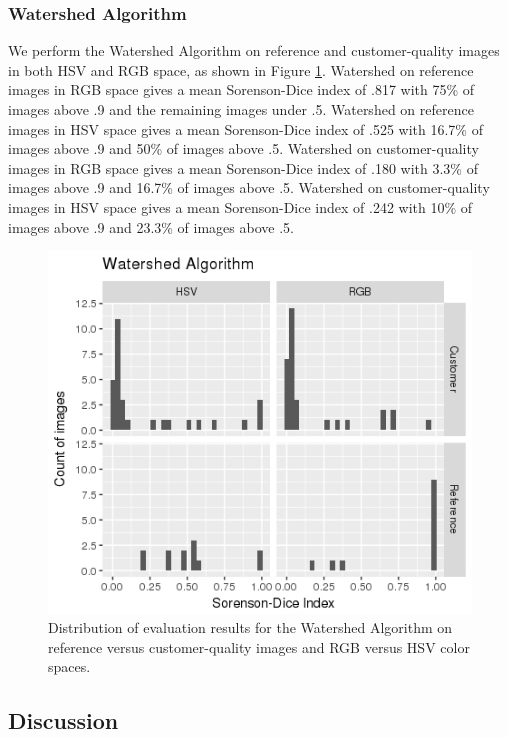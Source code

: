 \documentclass{article}
\begin{document}
\subsubsection{Watershed Algorithm}

We perform the Watershed Algorithm \cite{watershed} on reference and customer-quality images in both HSV and RGB space, as shown in Figure \ref{fig:water}. Watershed on reference images in RGB space gives a mean Sorenson-Dice index of .817 with 75\% of images above .9 and the remaining images under .5. Watershed on reference images in HSV space gives a mean Sorenson-Dice index of .525 with 16.7\% of images above .9 and 50\% of images above .5. Watershed on customer-quality images in RGB space gives a mean Sorenson-Dice index of .180 with 3.3\% of images above .9 and 16.7\% of images above .5. Watershed on customer-quality images in HSV space gives a mean Sorenson-Dice index of .242 with 10\% of images above .9 and 23.3\% of images above .5.

\begin{figure}
    \includegraphics[width=\linewidth]{images/water.jpeg}
    \caption{Distribution of evaluation results for the Watershed Algorithm on reference versus customer-quality images and RGB versus HSV color spaces.}
    \label{fig:water}
\end{figure}

\subsection{Discussion}
\label{discussion}
\end{document}
